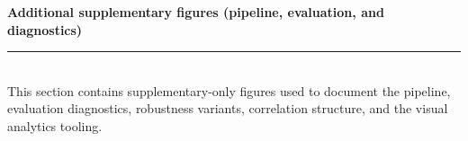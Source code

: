 \documentclass[11pt]{article}
\newcommand{\SubRule}{\color{black}\rule{\linewidth}{0.4pt}}
\newcommand{\Section}[1]{\noindent\textbf{#1}\\[-0.25em]\SubRule\\[0.1em]}
\begin{document}
\endgroup

\Section{Additional supplementary figures (pipeline, evaluation, and diagnostics)}
\noindent\justifying
This section contains supplementary-only figures used to document the pipeline, evaluation diagnostics, robustness
variants, correlation structure, and the visual analytics tooling.

{%
\setlength{\intextsep}{6pt}%
\setlength{\textfloatsep}{6pt}%
\setlength{\floatsep}{6pt}%
\setlength{\abovecaptionskip}{\baselineskip}%
\setlength{\belowcaptionskip}{0pt}%
\begin{figure}[!htbp]
\begingroup
\footnotesize
\setlength{\parskip}{0pt}%
\setlength{\parindent}{0pt}%
\setlength{\fboxsep}{2.5pt}
\setlength{\fboxrule}{0.4pt}
\newlength{\PipelineSeamOverlap}
\setlength{\PipelineSeamOverlap}{0.9pt}
\setlength{\extrarowheight}{0pt}%
\renewcommand{\arraystretch}{1.0}%
\newcommand{\PipelineCell}[3][white]{%
\fcolorbox{black!65}{#1}{%
\begin{minipage}[c]{\dimexpr\linewidth-2\fboxsep-2\fboxrule\relax}
\centering
{\bfseries #2}\par
\vspace{0.15em}
{#3}
\end{minipage}%
}%
}%
\newlength{\PipelineStepBoxHeight}
\setlength{\PipelineStepBoxHeight}{1.95cm}
\newcommand{\PipelineStepCell}[3][white]{%
\fcolorbox{black!65}{#1}{%
\begin{minipage}[c][\PipelineStepBoxHeight][c]{\dimexpr\linewidth-2\fboxsep-2\fboxrule\relax}
\centering
{\bfseries #2}\par
\vspace{0.15em}
{#3}
\end{minipage}%
}%
}%
\noindent\begin{minipage}[t]{0.67\linewidth}
\vspace{0pt}%
\raggedright
\newlength{\PipelineHalfColWidth}
\setlength{\PipelineHalfColWidth}{\dimexpr0.5\linewidth+0.5\PipelineSeamOverlap\relax}
\newcommand{\PipelineRow}[2]{%
\hbox{%
\begin{minipage}[t]{\PipelineHalfColWidth}#1\end{minipage}%
\hspace{-\PipelineSeamOverlap}%
}}
\end{minipage}
\end{figure}}
\end{document}
